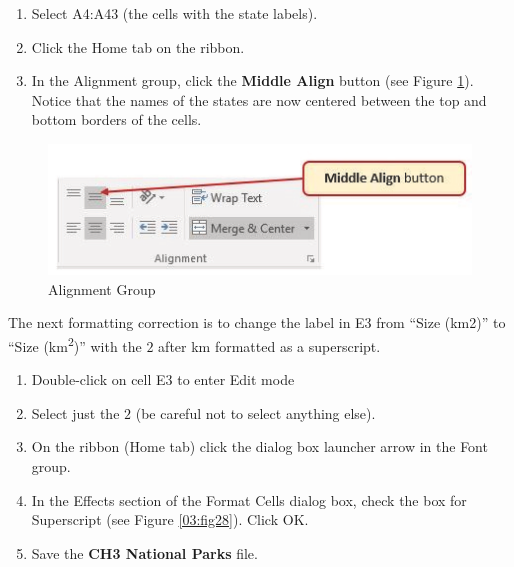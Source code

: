 \begin{enumerate}
	\item Select \textsf{A4:A43} (the cells with the state labels).
	\item Click the Home tab on the ribbon.
	\item In the Alignment group, click the \textbf{Middle Align} button (see Figure \ref{03:fig27}). Notice that the names of the states are now centered between the top and bottom borders of the cells.
\end{enumerate}

\begin{figure}[H]
	\centering
	\includegraphics[width=\maxwidth{.95\linewidth}]{gfx/ch03_fig27}
	\caption{Alignment Group}
	\label{03:fig27}
\end{figure}

The next formatting correction is to change the label in \textsf{E3} from ``Size (km2)'' to ``Size (km\textsuperscript{2})'' with the $ 2 $ after km formatted as a superscript.

\begin{enumerate}
	\item Double-click on cell \textsf{E3} to enter Edit mode
	\item Select just the $ 2 $ (be careful not to select anything else).
	\item On the ribbon (Home tab) click the dialog box launcher arrow in the Font group.
	\item In the Effects section of the Format Cells dialog box, check the box for Superscript (see Figure \ref{03:fig28}). Click OK.
	\item Save the \textbf{CH3 National Parks} file.
\end{enumerate}

